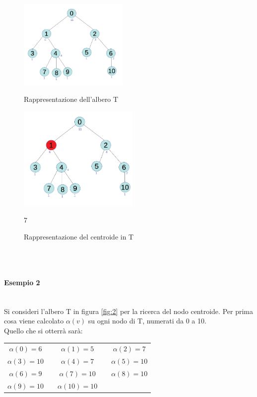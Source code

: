 	\begin{figure}[!htb]
	\begin{minipage}{0.48\textwidth}
		\centering
		\includegraphics[width=5.26cm]{capitolo3/grafo1c}
		\caption{Rappresentazione dell'albero T}
		\label{fig:2}
	\end{minipage}\hfill
	\begin{minipage}{0.48\textwidth}
		\centering
		\includegraphics[width=5.8cm]{capitolo3/grafo2}
		\caption{Rappresentazione del centroide in T}
		\label{fig:3}
	\end{minipage}7
\end{figure}
\mbox{}\\\\
\paragraph{Esempio 2}\mbox{}\\
Si consideri l'albero T in figura \ref{fig:2} per la ricerca del nodo centroide.
Per prima cosa  viene calcolato $\alpha(v)$ su ogni nodo di T, numerati da 0 a 10. \\
Quello che si otterr\`a sar\`a:



\begin{center}
	\begin{tabular}{ c c c c c  }
		$\alpha(0) = 6$ & & $\alpha(1) = 5$ & & $\alpha(2) = 7$ \\ 
		$\alpha(3) = 10$ && $\alpha(4) = 7$ &&  $\alpha(5) =  10$ \\  
		$\alpha(6) = 9$ && $\alpha(7) = 10$ && $\alpha(8) = 10$ \\
		 $\alpha(9) = 10$ && $\alpha(10) = 10$ &&
	\end{tabular}
\end{center}


